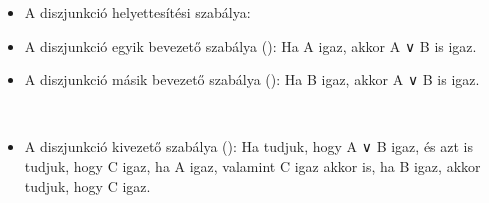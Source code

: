 \begin{itemize}
\item A diszjunkció helyettesítési szabálya:
\begin{code}%
%
\>[6]%
\>[12]\AgdaSymbol{:}\AgdaSpace{}%
\AgdaSpace{}%
\AgdaSpace{}%
\AgdaSpace{}%
\AgdaSymbol{\}\{}\AgdaSpace{}%
\AgdaSymbol{:}\AgdaSpace{}%
\AgdaSpace{}%
\AgdaSpace{}%
\AgdaSymbol{\}}\AgdaSpace{}%
\AgdaSpace{}%
\AgdaSymbol{(}\AgdaSpace{}%
\AgdaSpace{}%
\AgdaSymbol{)}\AgdaSpace{}%
\AgdaOperator{\AgdaField{[}}\AgdaSpace{}%
\AgdaSpace{}%
\AgdaOperator{\AgdaField{]ᶠ}}\AgdaSpace{}%
\AgdaSpace{}%
\AgdaSpace{}%
\AgdaOperator{\AgdaField{[}}\AgdaSpace{}%
\AgdaSpace{}%
\AgdaOperator{\AgdaField{]ᶠ}}\AgdaSpace{}%
\AgdaSpace{}%
\AgdaSpace{}%
\AgdaOperator{\AgdaField{[}}\AgdaSpace{}%
\AgdaSpace{}%
\AgdaOperator{\AgdaField{]ᶠ}}\<%
\end{code}
\item A diszjunkció egyik bevezető szabálya (): Ha A igaz, akkor A ∨ B is igaz.
\item A diszjunkció másik bevezető szabálya (): Ha B igaz, akkor A ∨ B is igaz.
\begin{code}%
%
\>[6]%
\>[12]\AgdaSymbol{:}\AgdaSpace{}%
\AgdaSpace{}%
\AgdaSpace{}%
\AgdaSymbol{\}}\AgdaSpace{}%
\AgdaSpace{}%
\AgdaSpace{}%
\AgdaSpace{}%
\AgdaSpace{}%
\AgdaSpace{}%
\AgdaSpace{}%
\AgdaSpace{}%
\AgdaSymbol{(}\AgdaSpace{}%
\AgdaSpace{}%
\AgdaSymbol{)}\<%
\\
%
\>[6]%
\>[12]\AgdaSymbol{:}\AgdaSpace{}%
\AgdaSpace{}%
\AgdaSpace{}%
\AgdaSymbol{\}}\AgdaSpace{}%
\AgdaSpace{}%
\AgdaSpace{}%
\AgdaSpace{}%
\AgdaSpace{}%
\AgdaSpace{}%
\AgdaSpace{}%
\AgdaSpace{}%
\AgdaSymbol{(}\AgdaSpace{}%
\AgdaSpace{}%
\AgdaSymbol{)}\<%
\end{code}
\item A diszjunkció kivezető szabálya (): Ha tudjuk, hogy A ∨ B igaz, és azt is tudjuk, hogy C igaz, ha A igaz, valamint C igaz akkor is, ha B igaz, akkor tudjuk, hogy C igaz.

\end{itemize}
